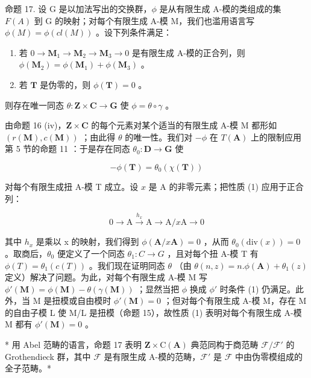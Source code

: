命题 17. 设 G 是以加法写出的交换群，\(\phi\) 是从有限生成 A-模的类组成的集 \(F(A)\) 到 G 的映射；对每个有限生成 A-模 M，我们也滥用语言写 \(\phi(M) = \phi(cl(M))\) 。设下列条件满足：

\begin{enumerate}
\def\labelenumi{(\arabic{enumi})}
\item
  若 \(0 \to \mathbf{M}_1 \to \mathbf{M}_2 \to \mathbf{M}_3 \to 0\) 是有限生成 A-模的正合列，则 \(\phi(\mathbf{M}_2) = \phi(\mathbf{M}_1) + \phi(\mathbf{M}_3)\) 。
\item
  若 \(\mathbf{T}\) 是伪零的，则 \(\phi (\mathbf{T}) = 0\) 。
\end{enumerate}

则存在唯一同态 \(\theta: \mathbf{Z} \times \mathbf{C} \to \mathbf{G}\) 使 \(\phi = \theta \circ \gamma\) 。

由命题 16 (iv)，\(\mathbf{Z} \times \mathbf{C}\) 的每个元素对某个适当的有限生成 A-模 M 都形如 \((r(\mathbf{M}), c(\mathbf{M}))\) ；由此得 \(\theta\) 的唯一性。我们对 \(-\phi\) 在 \(T(\mathbf{A})\) 上的限制应用第 5 节的命题 11 ：于是存在同态 \(\theta_0: \mathbf{D} \to \mathbf{G}\) 使

\[
- \phi (\mathbf {T}) = \theta_ {0} (\chi (\mathbf {T}))
\]

对每个有限生成扭 A-模 T 成立。设 \(x\) 是 A 的非零元素；把性质 (1) 应用于正合列：

\[
0 \longrightarrow \mathrm{A} \xrightarrow {h _ {x}} \mathrm{A} \longrightarrow \mathrm{A} / x \mathrm{A} \longrightarrow 0
\]

其中 \(h_{x}\) 是乘以 x 的映射，我们得到 \(\phi(\mathbf{A}/x\mathbf{A}) = 0\) ，从而 \(\theta_{0}(\mathrm{div}(x)) = 0\) 。取商后，\(\theta_{0}\) 便定义了一个同态 \(\theta_{1}: C \to G\) ，且对每个扭 A-模 T 有 \(\phi(T) = \theta_{1}(c(T))\) 。我们现在证明同态 \(\theta\) （由 \(\theta(n, z) = n.\phi(\mathbf{A}) + \theta_{1}(z)\) 定义）解决了问题。为此，对每个有限生成 A-模 M 写 \(\phi'(\mathbf{M}) = \phi(\mathbf{M}) - \theta(\gamma(\mathbf{M}))\) ；显然当把 \(\phi\) 换成 \(\phi'\) 时条件 (1) 仍满足。此外，当 M 是扭模或自由模时 \(\phi'(\mathbf{M}) = 0\) ；但对每个有限生成 A-模 M，存在 M 的自由子模 L 使 M/L 是扭模（命题 15），故性质 (1) 表明对每个有限生成 A-模 M 都有 \(\phi'(\mathbf{M}) = 0\) 。

* 用 Abel 范畴的语言，命题 17 表明 \(\mathbf{Z} \times \mathrm{C}(\mathbf{A})\) 典范同构于商范畴 \(\mathcal{F}/\mathcal{F}'\) 的 Grothendieck 群，其中 \(\mathcal{F}\) 是有限生成 A-模的范畴，\(\mathcal{F}'\) 是 \(\mathcal{F}\) 中由伪零模组成的全子范畴。*

